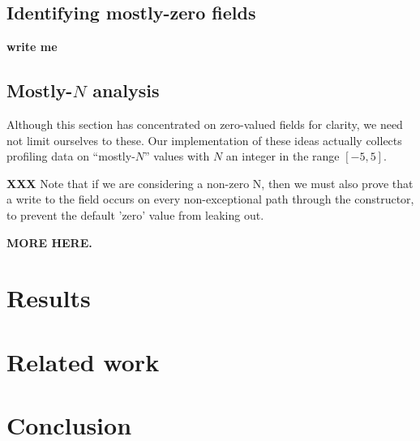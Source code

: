 \documentclass[preprint]{acmconf}
\begin{document}
\subsection{Identifying mostly-zero fields}

{\bf write me}

\subsection{Mostly-$N$ analysis}
Although this section has concentrated on zero-valued fields for
clarity, we need not limit ourselves to these.  Our implementation of
these ideas actually collects profiling data on ``mostly-$N$'' values
with $N$ an integer in the range $[-5,5]$.

{\bf XXX} Note that if we are considering a non-zero N, then
  we must also prove that a write to the field occurs on every
  non-exceptional path through the constructor, to prevent the default
  'zero' value from leaking out.

{\bf MORE HERE.}

\section{Results}


\section{Related work}

\section{Conclusion}




%
\end{document}

